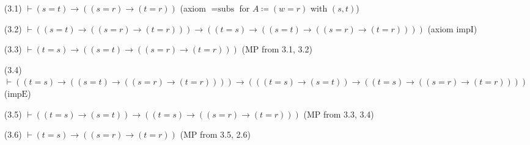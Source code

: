 \documentclass[10pt,a4paper]{article}
\begin{document}
\begin{enumerate}
  \begin{enumerate}
  \item[(3.1)] $\vdash (s = t) \to ((s = r) \to (t = r))$ \hfill (axiom $=\textrm{subs}$ for $A \coloneqq (w = r)$ with $(s, t)$)
  \item[(3.2)] $\vdash ((s = t) \to ((s = r) \to (t = r))) \to ((t = s) \to ((s = t) \to ((s = r) \to (t = r))))$ \hfill (axiom $\textrm{impI}$)
  \item[(3.3)] $\vdash (t = s) \to ((s = t) \to ((s = r) \to (t = r)))$ \hfill ($\textrm{MP}$ from 3.1, 3.2)
  \item[(3.4)] $\vdash ((t = s) \to ((s = t) \to ((s = r) \to (t = r)))) \to (((t = s) \to (s = t)) \to ((t = s) \to ((s = r) \to (t = r))))$ \hfill ($\textrm{impE}$)
  \item[(3.5)] $\vdash ((t = s) \to (s = t)) \to ((t = s) \to ((s = r) \to (t = r)))$ \hfill ($\textrm{MP}$ from 3.3, 3.4)
  \item[(3.6)] $\vdash (t = s) \to ((s = r) \to (t = r))$ \hfill ($\textrm{MP}$ from 3.5, 2.6)
  \end{enumerate}
\end{enumerate}
\myqed
\end{document}
